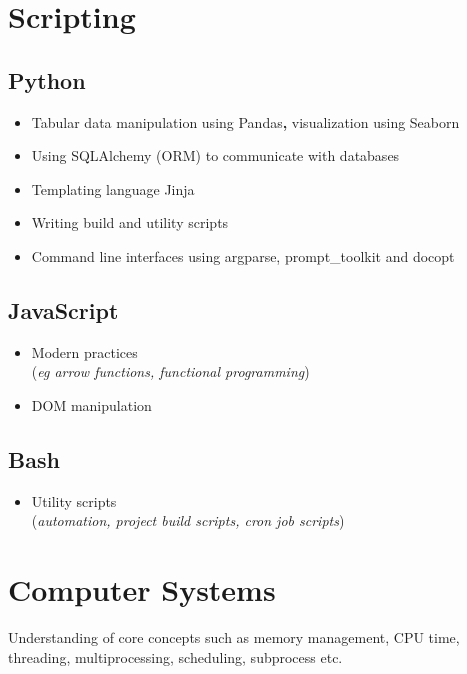 \documentclass[a4paper, 13pt, draft]{article}
\newcommand{\proglang}[1]{%
    \subsection*{#1}
}
\begin{document}
\pagebreak

\section*{\Large{Scripting}}

    \proglang{Python}

    \begin{itemize}
	\setlength\itemsep{0em}
    \item
	Tabular data manipulation using Pandas\textbf{,} visualization using
	Seaborn
    \item
	Using SQLAlchemy (ORM) to communicate with databases
    \item
	Templating language Jinja
    \item
	Writing build and utility scripts
    \item
	Command line interfaces using argparse, prompt\_toolkit and docopt \\
\end{itemize}

\begin{multicols}{2}

    \proglang{JavaScript} 

    \begin{itemize}
	\setlength\itemsep{0em}
    \item Modern practices \\ (\textit{eg arrow functions, functional programming})
    \item DOM manipulation 
\end{itemize}

\proglang{Bash}

\begin{itemize}		
    \item Utility scripts \\ (\textit{automation, project build scripts, cron job scripts})
\end{itemize}		

\end{multicols}

\section*{\Large{Computer Systems}}

    Understanding of core concepts such as memory management, CPU time,
    threading, multiprocessing, scheduling, subprocess etc.
\end{document}
